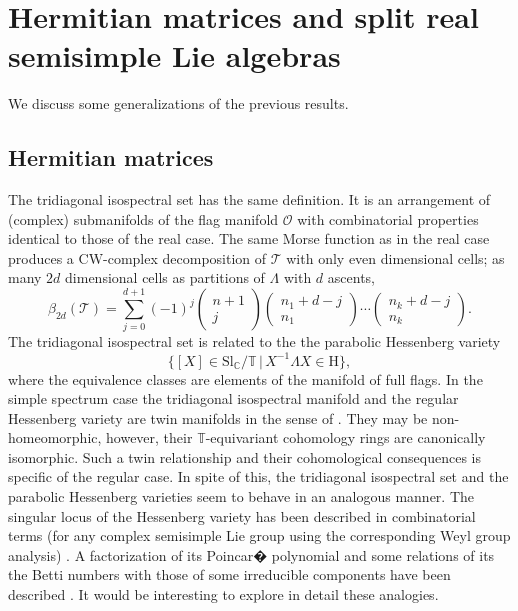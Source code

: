 \documentclass[reqno]{amsart}
\newcommand{\cO}{\mathcal{O}}
\newcommand{\cT}{\mathcal{T}}
\newcommand{\C}{\mathbb{C}}
\newcommand{\Sl}{\mathrm{Sl}}
\renewcommand{\H}{\mathrm{H}}
\begin{document}
\section{Hermitian matrices and split real semisimple Lie algebras}\label{sec:genenralizations}
We discuss some generalizations of the previous results.


\subsection{Hermitian matrices}\label{ssec:Hermitian}


 The tridiagonal isospectral set has the same definition. It is an arrangement of (complex) submanifolds of the flag manifold $\cO$ with combinatorial properties identical to those of the real case. The same Morse function as in the real case produces a $\mathrm{CW}$-complex decomposition of $\cT$ with only even dimensional cells; as many $2d$ dimensional cells as partitions of $\Lambda$ with $d$ ascents,
 \[\beta_{2d}(\cT)=\sum_{j=0}^{d+1} (-1)^j\begin{pmatrix}n+1\\j\end{pmatrix}\begin{pmatrix}n_1+d-j\\n_1\end{pmatrix}\cdots \begin{pmatrix}n_k+d-j\\n_k\end{pmatrix}.\]
 The tridiagonal isospectral set is related to the the parabolic Hessenberg variety
 \[\{[X]\in \Sl_\C/\mathbb{T}\,|\, X^{-1}\Lambda X\in \H\},\]
 where the equivalence classes are elements of the manifold of full flags. In the simple spectrum case the tridiagonal isospectral manifold and the regular Hessenberg variety are twin manifolds in the sense of  \cite{AB}. They may be non-homeomorphic, however, their $\mathbb{T}$-equivariant cohomology rings are canonically isomorphic. Such a twin relationship and their cohomological consequences is specific of the regular case. In spite of this, the tridiagonal isospectral set and the parabolic Hessenberg varieties seem to behave in an analogous manner.
 The singular locus of the Hessenberg variety has been described in combinatorial terms (for any complex semisimple Lie group using the corresponding Weyl group analysis) \cite{IP,PT}. A factorization of its Poincar� polynomial and some relations of its the Betti numbers with those of some irreducible components have been described \cite{PT}. It would be interesting to explore in detail these  analogies.
\end{document}
